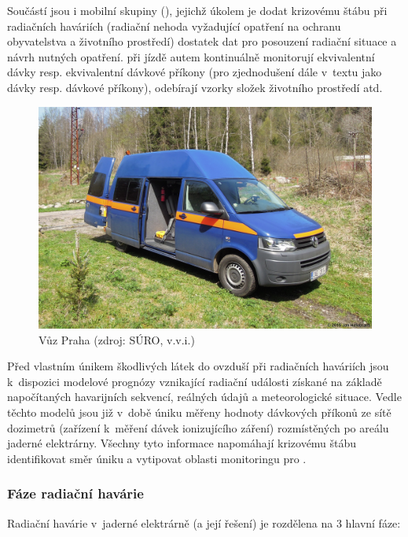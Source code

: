 Součástí  jsou i mobilní skupiny (), jejichž úkolem je
dodat krizovému štábu při radiačních haváriích (radiační nehoda
vyžadující opatření na ochranu obyvatelstva a životního prostředí)
dostatek dat pro posouzení radiační situace a návrh nutných
opatření.  při jízdě autem kontinuálně monitorují ekvivalentní
dávky resp. ekvivalentní dávkové příkony (pro zjednodušení dále
v~textu jako dávky resp. dávkové příkony), odebírají vzorky složek
životního prostředí atd.  \cite{metodika} \cite{pecha2011monitorovani}

\begin{figure}[H] \centering
    \includegraphics[scale=0.6]{./pictures/vuzSURO.jpg}
      	\caption[Vůz   Praha]{Vůz  
Praha (zdroj: SÚRO, v.v.i.)}
    	\label{fig:vuzSURO}
\end{figure}

Před vlastním únikem škodlivých látek do ovzduší při radiačních
haváriích jsou k~dispozici modelové prognózy vznikající radiační
události získané na základě napočítaných havarijních sekvencí,
reálných údajů a meteorologické situace. Vedle těchto modelů jsou již
v~době úniku měřeny hodnoty dávkových příkonů ze sítě dozimetrů
(zařízení k~měření dávek ionizujícího záření) rozmístěných
po areálu jaderné elektrárny. Všechny tyto informace napomáhají
krizovému štábu identifikovat směr úniku a vytipovat oblasti
monitoringu pro .

\subsubsection{Fáze radiační havárie}

Radiační havárie v~jaderné elektrárně (a její řešení) je rozdělena na
3 hlavní fáze:

